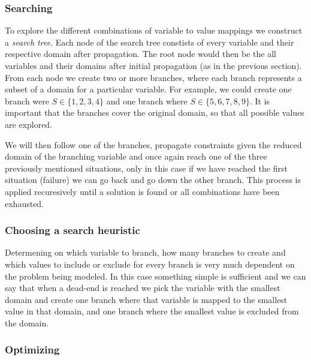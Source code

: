 \subsubsection{Searching}

To explore the different combinations of variable to value mappings we construct a \textit{
search tree}. Each node of the search tree constists of every variable and their respective
domain after propagation. The root node would then be the all variables and their domains
after initial propagation (as in the previous section). From each node we create two or
more branches, where each branch represents a subset of a domain for a particular variable.
For example, we could create one branch were $S \in \{1, 2, 3, 4\}$ and one branch where $S \in 
\{5, 6, 7, 8, 9\}$. It is important that the branches cover the original domain, so that
all possible values are explored.

We will then follow one of the branches, propagate constraints given the reduced domain
of the branching variable and once again reach one of the three previously mentioned
situations, only in this case if we have reached the first situation (failure) we can go
back and go down the other branch. This process is applied recuresively until a solution
is found or all combinations have been exhausted.

\subsubsection{Choosing a search heuristic}

Determening on which variable to branch, how many branches to create and which values to
include or exclude for every branch is very much dependent on the problem being modeled.
In this case something simple is sufficient and we can say that when a dead-end is reached
we pick the variable with the smallest domain and create one branch where that variable
is mapped to the smallest value in that domain, and one branch where the smallest value
is excluded from the domain.




\subsubsection{Optimizing}

